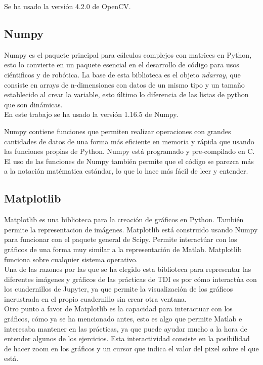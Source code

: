 \documentclass[a4paper,12pt]{report}
\begin{document}
Se ha usado la versión 4.2.0 de OpenCV.\\


\subsection{Numpy}

Numpy es el paquete principal para cálculos complejos con matrices en Python, esto lo convierte en un paquete esencial en el desarrollo de código para usos ciéntificos y de robótica. La base de esta biblioteca es el objeto \emph{ndarray}, que consiste en arrays de n-dimensiones con datos de un mismo tipo y un tamaño establecido al crear la variable, esto último lo diferencia de las listas de python que son dinámicas.\\

En este trabajo se ha usado la versión 1.16.5 de Numpy.

Numpy contiene funciones que permiten realizar operaciones con grandes cantidades de datos de una forma más eficiente en memoria y rápida que usando las funciones propias de Python. Numpy está programado y pre-compilado en C. El uso de las funciones de Numpy también permite que el código se parezca más a la notación matématica estándar, lo que lo hace más fácil de leer y entender.\\

\subsection{Matplotlib}

Matplotlib es una biblioteca para la creación de gráficos en Python. También permite la representacion de imágenes. Matplotlib está construido usando Numpy para funcionar con el paquete general de Scipy. Permite interactúar con los gráficos de una forma muy similar a la representación de Matlab. Matplotlib funciona sobre cualquier sistema operativo. \\

Una de las razones por las que se ha elegido esta biblioteca para representar las diferentes imágenes y gráficos de las prácticas de TDI es por cómo interactúa con los cuadernillos de Jupyter, ya que permite la visualización de los gráficos incrustrada en el propio cuadernillo sin crear otra ventana. \\

Otro punto a favor de Matplotlib es la capacidad para interactuar con los gráficos, cómo ya se ha mencionado antes, esto es algo que permite Matlab e interesaba mantener en las prácticas, ya que puede ayudar mucho a la hora de entender algunos de los ejercicios. Esta interactividad consiste en la posibilidad de hacer zoom en los gráficos y un cursor que indica el valor del pixel sobre el que está.
\end{document}
